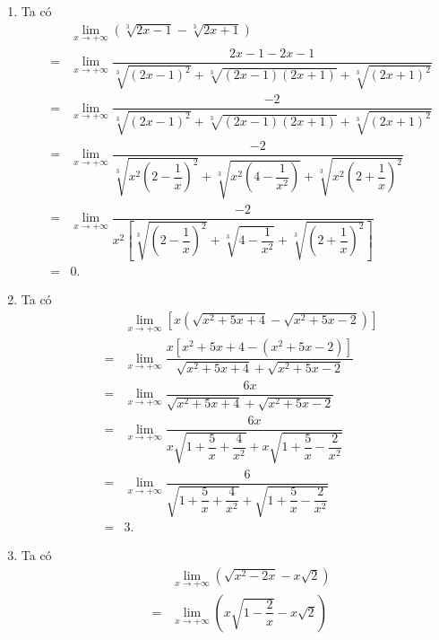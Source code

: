 \begin{ex}
{\begin{enumerate}
			 \item Ta có
			\begin{eqnarray*}
				&&\displaystyle\lim_{x \to +\infty} \left(  \sqrt[3]{2x - 1} - \sqrt[3]{2x + 1} \right)\\
				& = & \lim_{x \to +\infty} \dfrac{2x - 1 - 2x - 1}{\sqrt[3]{\left(2x -  1\right)^2} + \sqrt[3]{\left(2x - 1\right)\left(2x + 1\right)} + \sqrt[3]{\left(2x + 1\right)^2}} \\
				& = & \lim_{x \to +\infty} \dfrac{-2}{\sqrt[3]{\left(2x - 1\right)^2} + \sqrt[3]{\left(2x - 1\right)\left(2x +  1\right)} + \sqrt[3]{\left(2x + 1\right)^2}} \\
				& = & \lim_{x \to +\infty} \dfrac{-2}{\sqrt[3]{x^2 \left(2 - \dfrac{1}{x} \right)^2} + \sqrt[3]{x^2 \left(4 - \dfrac{1}{x^2} \right)} + \sqrt[3]{x^2 \left(2 + \dfrac{1}{x}  \right)^2}} \\
				 & = & \lim_{x \to +\infty} \dfrac{-2}{x^2 \left[\sqrt[3]{\left(2 - \dfrac{1}{x} \right)^2} + \sqrt[3]{4 - \dfrac{1}{x^2}} + \sqrt[3]{\left(2 + \dfrac{1}{x} \right)^2} \right]}\\
				 &=& 0.
			\end{eqnarray*}
			\item Ta  có
			\begin{eqnarray*}
				&&\displaystyle\lim_{x \to +\infty}\left[x\left(  \sqrt{x^2+5x+4}-\sqrt{x^2+5x-2}\right)\right]\\
				& = & \displaystyle\lim_{x \to +\infty} \dfrac{x \left[x^2 + 5x  + 4 - \left( x^2 + 5x - 2 \right) \right]}{\sqrt{x^2 + 5x + 4} + \sqrt{x^2 + 5x - 2}} \\
				& = & \displaystyle\lim_{x \to +\infty} \dfrac{6x}{\sqrt{x^2 + 5x + 4} + \sqrt{x^2 + 5x - 2}} \\ 
				& = & \displaystyle\lim_{x  \to +\infty} \dfrac{6x}{x \sqrt{1 + \dfrac{5}{x} + \dfrac{4}{x^2}} + x \sqrt{1 + \dfrac{5}{x} - \dfrac{2}{x^2}}} \\
				& = & \displaystyle\lim_{x \to +\infty} \dfrac{6}{\sqrt{1  + \dfrac{5}{x} + \dfrac{4}{x^2}} + \sqrt{1 + \dfrac{5}{x} - \dfrac{2}{x^2}}} \\
				& = & 3. 
			\end{eqnarray*}
			 \item Ta có
			\begin{eqnarray*}
				 &&\displaystyle\lim_{x \to +\infty} \left(\sqrt{x^2-2x}-x\sqrt{2} \right)\\
				 &=& \displaystyle\lim_{x \to +\infty} \left(x\sqrt{1-\dfrac{2}{x}} - x \sqrt{2}\right) \\

\end{eqnarray*}
\end{enumerate}}
\end{ex}
